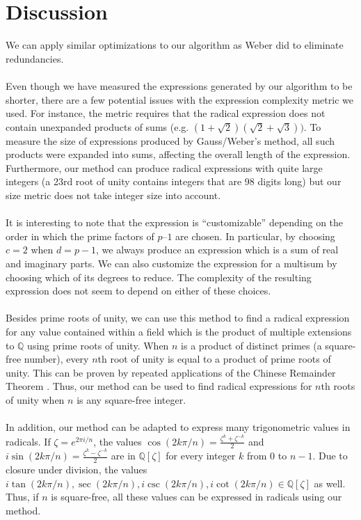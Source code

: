 \documentclass{article}
\begin{document}
\section{Discussion}
    We can apply similar optimizations to our algorithm as Weber did to eliminate redundancies.\\
    \\
    Even though we have measured the expressions generated by our algorithm to be shorter, there are a few potential issues with the expression complexity metric we used. For instance, the metric requires that the radical expression does not contain unexpanded products of sums (e.g. $ (1 + \sqrt{2})(\sqrt{2} + \sqrt{3})) $. To measure the size of expressions produced by Gauss/Weber's method, all such products were expanded into sums, affecting the overall length of the expression. Furthermore, our method can produce radical expressions with quite large integers (a 23rd root of unity contains integers that are 98 digits long) but our size metric does not take integer size into account.\\
    \\
	It is interesting to note that the expression is ``customizable'' depending on the order in which the prime factors of $ p – 1 $ are chosen. In particular, by choosing $ c = 2 $ when $ d = p - 1 $, we always produce an expression which is a sum of real and imaginary parts. We can also customize the expression for a multisum by choosing which of its degrees to reduce. The complexity of the resulting expression does not seem to depend on either of these choices.\\
	\\
	Besides prime roots of unity, we can use this method to find a radical expression for any value contained within a field which is the product of multiple extensions to $ \mathbb{Q} $ using prime roots of unity. When $ n $ is a product of distinct primes (a square-free number), every $ n $th root of unity is equal to a product of prime roots of unity. This can be proven by repeated applications of the Chinese Remainder Theorem \cite{crt}. Thus, our method can be used to find radical expressions for $ n $th roots of unity when $ n $ is any square-free integer.\\
	\\
    In addition, our method can be adapted to express many trigonometric values in radicals. If $ \zeta = e^{2\pi i/n} $, the values $ \cos(2k\pi/n) = \frac{\zeta^k + \zeta^{-k}}{2} $ and $ i \sin(2k\pi/n) = \frac{\zeta^k - \zeta^{-k}}{2} $ are in $ \mathbb{Q}[\zeta] $ for every integer $ k $ from $ 0 $ to $ n - 1 $. Due to closure under division, the values $ i \tan(2k\pi/n), \sec(2k\pi/n), i \csc(2k\pi/n), i \cot(2k\pi/n) \in \mathbb{Q}[\zeta] $ as well. Thus, if $ n $ is square-free, all these values can be expressed in radicals using our method.\\
\end{document}
